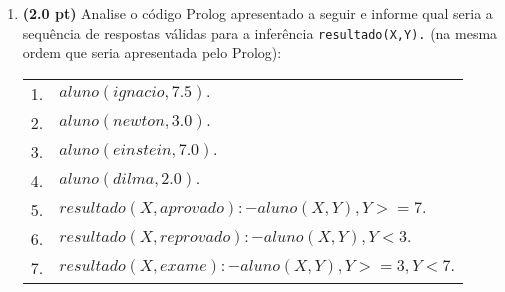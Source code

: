 \documentclass[a4paper,12pt]{article}
\begin{document}
\begin{enumerate}
\item {\bf (2.0 pt)} Analise o código Prolog apresentado a seguir e informe qual seria a sequência de respostas válidas para a inferência {\tt resultado(X,Y).} {\small (na mesma ordem que seria apresentada pelo Prolog)}:

\begin{center}
\begin{tabular}{ll}
 \hline \hline
    1. &  $aluno(ignacio,7.5).$ \\
    2. &  $aluno(newton,3.0).$ \\
    3. &  $aluno(einstein, 7.0).$ \\
    4. &  $aluno(dilma, 2.0).$\\
    5. &  $resultado(X,aprovado) :- aluno(X,Y), Y >= 7 .$ \\
    6. &  $resultado(X,reprovado) :- aluno(X,Y), Y < 3 .$ \\
    7. &  $resultado(X,exame) :- aluno(X,Y), Y >= 3 , Y < 7 .$ \\ \hline \hline
 \end{tabular}
\end{center}

\end{enumerate}
\end{document}
